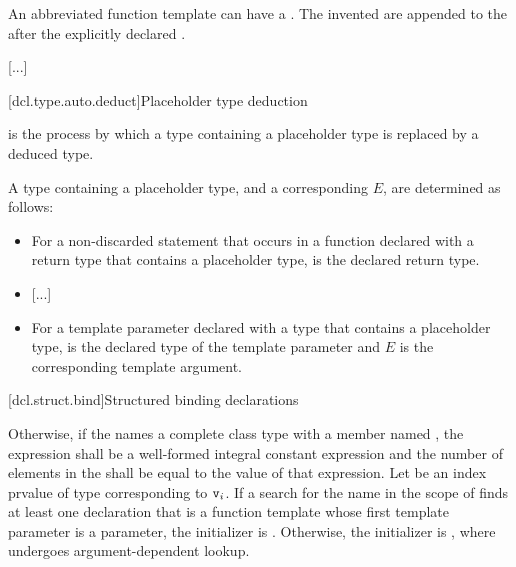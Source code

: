 \documentclass{wg21}
\begin{document}
\pnum
An abbreviated function template can have a .
The invented  are
appended to the  after
the explicitly declared .
\begin{example}
    \textcolor{noteclr}{[...]}
\end{example}

[dcl.type.auto.deduct]{Placeholder type deduction}
%

\pnum
{}
is the process by which
a type containing a placeholder type
is replaced by a deduced type.

\pnum
A type  containing a placeholder type,
and a corresponding  $E$,
are determined as follows:
\begin{itemize}
\item
For a non-discarded  statement that occurs
in a function declared with a return type
that contains a placeholder type,
 is the declared return type.

\item \textcolor{noteclr}{[...]}

\item
For a  template parameter declared with a type
that contains a placeholder type,
 is the declared type of the  template parameter
and $E$ is the corresponding template argument.
\end{itemize}


[dcl.struct.bind]{Structured binding declarations}%

\pnum
Otherwise, if
the  
names a complete class type with a member named ,
the expression 
shall be a well-formed integral constant expression
and
the number of elements in
the  shall be equal to the value of that
expression.
Let  be an index prvalue of type 
corresponding to $\texttt{v}_i$.
If a search for the name 
in the scope of 
finds at least one declaration
that is a function template whose first template parameter
is a  parameter,
the initializer is
. Otherwise, the initializer is ,
where  undergoes argument-dependent lookup.
\end{document}

